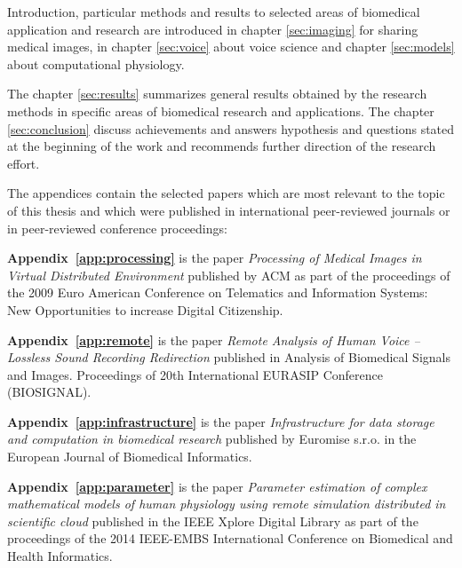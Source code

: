Introduction, particular methods and results to selected areas of biomedical application and research are introduced in chapter \ref{sec:imaging} for sharing medical images, in chapter \ref{sec:voice} about voice science and chapter \ref{sec:models} about computational physiology.

The chapter \ref{sec:results} summarizes general results obtained by the research methods in specific areas of biomedical research and applications. The chapter \ref{sec:conclusion} discuss achievements and answers hypothesis and questions stated at the beginning of the work and recommends further direction of the research effort.

The appendices contain the selected papers \cite{kulhanek2009,kulhanek2010b,kulhanek2010c,Kulhanek2014Parameters, Kulhanek2014Modeling, Kulhanek2014mefanet, Matejak2014sj} which are most relevant to the topic of this thesis and which were published in international peer-reviewed journals or in peer-reviewed conference proceedings:

\textbf{Appendix~\ref{app:processing}} is the paper \cite{kulhanek2009} \emph{Processing of Medical Images in Virtual Distributed Environment} published by ACM as part of the proceedings of the 2009 Euro American Conference on Telematics and Information Systems: New Opportunities to increase Digital Citizenship.

\textbf{Appendix~\ref{app:remote}} is the paper \cite{kulhanek2010b} \emph{Remote Analysis of Human Voice – Lossless Sound Recording Redirection} published in Analysis of Biomedical Signals and Images. Proceedings of 20th International EURASIP Conference (BIOSIGNAL).


\textbf{Appendix~\ref{app:infrastructure}} is the paper \cite{kulhanek2010c} \emph{Infrastructure for data storage and computation in biomedical research} published by Euromise s.r.o. in the European Journal of Biomedical Informatics.

\textbf{Appendix~\ref{app:parameter}} is the paper \cite{Kulhanek2014Parameters} \emph{Parameter estimation of complex mathematical models of human physiology using remote simulation distributed in scientific cloud} published in the IEEE Xplore Digital Library as part of the proceedings of the 2014 IEEE-EMBS International Conference on Biomedical and Health Informatics.

